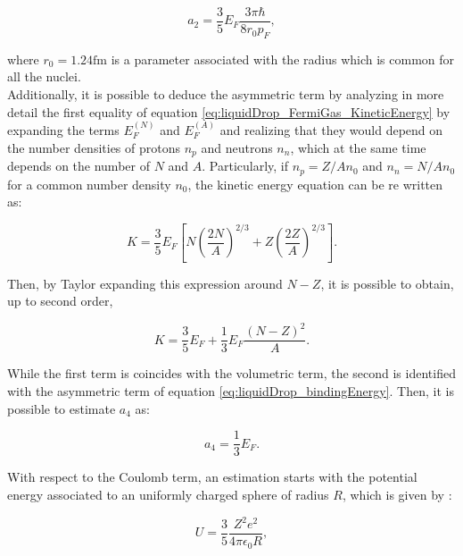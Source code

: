 \documentclass[openany]{book}
\begin{document}
\begin{equation}\label{eq:liquidDrop_FermiGas_surfaceConstant}
	a_2= \frac{3}{5}E_F \frac{ 3 \pi \hbar }{8 r_0 p_F},
\end{equation}

where $r_0 = 1.24\mathrm{fm}$ is a parameter associated with the radius which is common for all the nuclei. \\

Additionally, it is possible to deduce the asymmetric term by analyzing in more detail the first equality of equation \ref{eq:liquidDrop_FermiGas_KineticEnergy} by expanding the terms $E^{(N)}_F$ and $E^{(A)}_F$ and realizing that they would depend on the number densities of protons $n_p$ and neutrons $n_n$, which at the same time depends on the number of $N$ and $A$. Particularly, if $n_p = Z/A n_0$ and $n_n = N/A n_0$ for a common number density $n_0$, the kinetic energy equation can be re written as: 

\begin{equation}\label{eq:liquidDrop_FermiGas_asymmetric}
	K = \frac{3}{5}E_F \left [ N \left ( \frac{2N}{A} \right )^{2/3}  + Z \left ( \frac{2Z}{A} \right )^{2/3}  \right  ]. 
\end{equation}

Then, by Taylor expanding this expression around $N - Z$, it is possible to obtain, up to second order, 

\begin{equation}\label{eq:liquidDrop_FermiGas_asymmetric_approx}
	K = \frac{3}{5}E_F + \frac{1}{3}E_F \frac{(N - Z)^{2}}{A}. 
\end{equation}

While the first term is coincides with the volumetric term, the second is identified with the asymmetric term of equation \ref{eq:liquidDrop_bindingEnergy}. Then, it is possible to estimate $a_4$ as: 

\begin{equation}\label{eq:liquidDrop_FermiGas_asymmetricConstant}
	a_4 = \frac{1}{3}E_F.
\end{equation}

With respect to the Coulomb term, an estimation starts with the potential energy associated to an uniformly charged sphere of radius $R$, which is given by \cite{bohr_mottelson_1998}:

\begin{equation}\label{eq:liquidDrop_FermiGas_coulombEnergy}
	U = \frac{3}{5} \frac{Z^2e^2}{4\pi\epsilon_0 R},
\end{equation}
\end{document}
